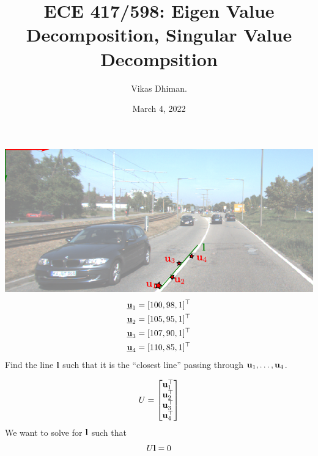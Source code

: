 \documentclass[times,t]{beamer}
\title{ECE 417/598: Eigen Value Decomposition, Singular Value Decompsition }
\author{Vikas Dhiman.  }
\date{March 4, 2022}
\begin{document}
\newcommand{\ubfu}{\underline{\bfu}}
\begin{frame}
  \titlepage
  \end{frame}
\begin{frame}
  \includegraphics[width=\linewidth]{media/lane-from-points.pdf}
  \begin{align*}
    \ubfu_1 &= [100, 98, 1]^\top\\
    \ubfu_2 &= [105, 95, 1]^\top\\
    \ubfu_3 &= [107, 90, 1]^\top\\
    \ubfu_4 &= [110, 85, 1]^\top
    \end{align*}
    Find  the line $\mathbf{l}$ such that it is the ``closest line'' passing through
    $\mathbf{u}_1, \dots, \mathbf{u}_4$.
\end{frame}

\begin{frame}
  \[
  U = \begin{bmatrix}\mathbf{u}_1^\top  \\
    \mathbf{u}_2^\top \\
    \mathbf{u}_3^\top \\
    \mathbf{u}_4^\top
  \end{bmatrix}
  \]
  We want to solve for $\mathbf{l}$ such that
  \[
    U \mathbf{l} = 0
  \]
\end{frame}
\end{document}
